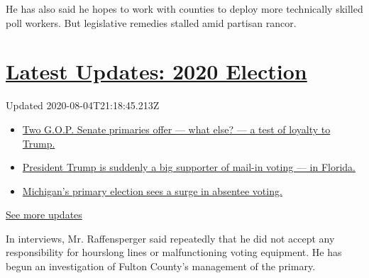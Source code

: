 He has also said he hopes to work with counties to deploy more
technically skilled poll workers. But legislative remedies stalled amid
partisan rancor.

\hypertarget{latest-updates-2020-election}{%
\section{\texorpdfstring{\href{https://www.nytimes3xbfgragh.onion/2020/08/04/us/elections/primary-election-michigan-arizona-kansas.html?action=click\&pgtype=Article\&state=default\&region=MAIN_CONTENT_1\&context=storylines_live_updates}{Latest
Updates: 2020
Election}}{Latest Updates: 2020 Election}}\label{latest-updates-2020-election}}

Updated 2020-08-04T21:18:45.213Z

\begin{itemize}
\tightlist
\item
  \href{https://www.nytimes3xbfgragh.onion/2020/08/04/us/elections/primary-election-michigan-arizona-kansas.html?action=click\&pgtype=Article\&state=default\&region=MAIN_CONTENT_1\&context=storylines_live_updates\#link-3924dd44}{Two
  G.O.P. Senate primaries offer --- what else? --- a test of loyalty to
  Trump.}
\item
  \href{https://www.nytimes3xbfgragh.onion/2020/08/04/us/elections/primary-election-michigan-arizona-kansas.html?action=click\&pgtype=Article\&state=default\&region=MAIN_CONTENT_1\&context=storylines_live_updates\#link-32b39e33}{President
  Trump is suddenly a big supporter of mail-in voting --- in Florida.}
\item
  \href{https://www.nytimes3xbfgragh.onion/2020/08/04/us/elections/primary-election-michigan-arizona-kansas.html?action=click\&pgtype=Article\&state=default\&region=MAIN_CONTENT_1\&context=storylines_live_updates\#link-ab1004d}{Michigan's
  primary election sees a surge in absentee voting.}
\end{itemize}

\href{https://www.nytimes3xbfgragh.onion/2020/08/04/us/elections/primary-election-michigan-arizona-kansas.html?action=click\&pgtype=Article\&state=default\&region=MAIN_CONTENT_1\&context=storylines_live_updates}{See
more updates}

In interviews, Mr. Raffensperger said repeatedly that he did not accept
any responsibility for hourslong lines or malfunctioning voting
equipment. He has begun an investigation of Fulton County's management
of the primary.

